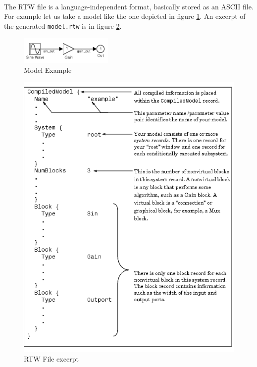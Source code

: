 \paragraph{} The RTW file is a language-independent format, basically stored as an ASCII file. For example let us take a model like the one depicted in figure \ref{fig:RTWModelExample}. An excerpt of the generated \verb|model.rtw| is in figure \ref{fig:RTWFileExample}.

\begin{figure}[htbp] 
\centering    
\includegraphics[width=0.4\textwidth]{RTWModelExample}
\caption{Model Example}
\label{fig:RTWModelExample}
\end{figure}

\begin{figure}[htbp] 
\centering    
\includegraphics[width=1.0\textwidth]{RTWFileExample}
\caption{RTW File excerpt}
\label{fig:RTWFileExample}
\end{figure}

